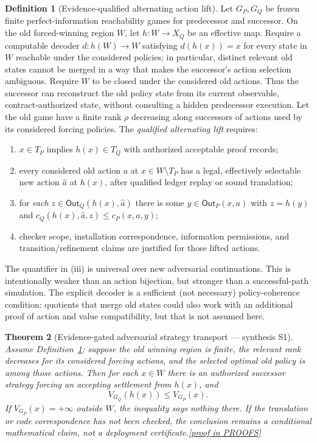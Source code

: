 \documentclass[11pt,letterpaper]{article}
\newtheorem{theorem}{Theorem}[section]
\theoremstyle{definition}
\newtheorem{definition}[theorem]{Definition}
\theoremstyle{remark}
\newcommand{\Out}{\mathsf{Out}}
\newcommand{\prooflink}[1]{\hfill\hyperlink{proof:#1}{\footnotesize[proof in PROOFS]}}
\begin{document}
\begin{definition}[Evidence-qualified alternating action lift]\label{def:lift}
Let $G_P,G_Q$ be frozen finite perfect-information reachability games for predecessor and successor. On the old forced-winning region $W$, let $h:W\to X_Q$ be an effective map. Require a computable decoder $d:h(W)\to W$ satisfying $d(h(x))=x$ for every state in $W$ reachable under the considered policies; in particular, distinct relevant old states cannot be merged in a way that makes the successor's action selection ambiguous. Require $W$ to be closed under the considered old actions. Thus the successor can reconstruct the old policy state from its current observable, contract-authorized state, without consulting a hidden predecessor execution. Let the old game have a finite rank $\rho$ decreasing along successors of actions used by its considered forcing policies. The \emph{qualified alternating lift} requires:
\begin{enumerate}[label=(\roman*),leftmargin=2em]
\item $x\in T_P$ implies $h(x)\in T_Q$ with authorized acceptable proof records;
\item every considered old action $a$ at $x\in W\setminus T_P$ has a legal, effectively selectable new action $\widehat a$ at $h(x)$, after qualified ledger replay or sound translation;
\item for \emph{each} $z\in\Out_Q(h(x),\widehat a)$ there is some $y\in\Out_P(x,a)$ with $z=h(y)$ and $c_Q(h(x),\widehat a,z)\leq c_P(x,a,y)$;
\item checker scope, installation correspondence, information permissions, and transition/refinement claims are justified for those lifted actions.
\end{enumerate}
The quantifier in (iii) is universal over new adversarial continuations. This is intentionally weaker than an action bijection, but stronger than a successful-path simulation. The explicit decoder is a sufficient (not necessary) policy-coherence condition: quotients that merge old states could also work with an additional proof of action and value compatibility, but that is not assumed here.
\end{definition}

\begin{theorem}[Evidence-gated adversarial strategy transport --- synthesis S1]\label{thm:lift}\hypertarget{claim:lift}{}
Assume Definition~\ref{def:lift}; suppose the old winning region is finite, the relevant rank decreases for its considered forcing actions, and the selected optimal old policy is among those actions. Then for each $x\in W$ there is an authorized successor strategy forcing an accepting settlement from $h(x)$, and
\[
                        V_{G_Q}(h(x))\leq V_{G_P}(x).
\]
If $V_{G_P}(x)=+\infty$ outside $W$, the inequality says nothing there. If the translation or code correspondence has not been checked, the conclusion remains a conditional mathematical claim, not a deployment certificate.\prooflink{lift}
\end{theorem}
\end{document}
